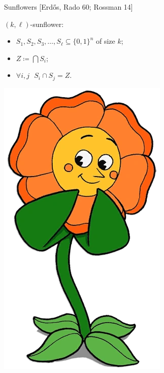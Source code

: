 \begin{frame}{Sunflowers [Erd\H{o}s, Rado 60; Rossman 14]}

    \begin{minipage}{0.55\linewidth}
        $(k, \ell)$-sunflower:
        \begin{itemize}
            \item $S_1, S_2, S_3, \dots, S_{\ell} \subseteq \{0, 1\}^n$ of size $k$;
            \item $Z \coloneqq \bigcap S_i$;
            \item $\forall i, j ~~~ S_i \cap S_j = Z$.
        \end{itemize}
    \end{minipage}
    \begin{minipage}{0.2\linewidth}
        \centering
        \pause
        
    \end{minipage}
    \begin{minipage}{0.2\linewidth}
        \centering
        \pause
        \includegraphics[scale = 0.1]{pics/cagney.png}
    \end{minipage}

    \pause
    \vspace{0.3cm}
    

\end{frame}
